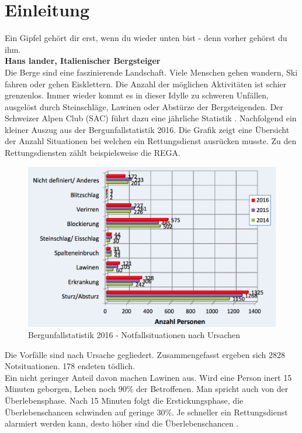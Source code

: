 \documentclass[11pt,english,german]{report}
\theoremstyle{definition}
\begin{document}
\chapter{Einleitung}
Ein Gipfel gehört dir erst, wenn du wieder unten bist - denn vorher gehörst du ihm.\\[0.3cm]
\textbf{Hans lander, Italienischer Bergsteiger\cite{kammerlander}} \\[0.5cm]
\noindent
Die Berge sind eine faszinierende Landschaft. Viele Menschen gehen wandern, Ski fahren oder gehen Eisklettern. Die Anzahl der möglichen Aktivitäten ist schier grenzenlos. Immer wieder kommt es in dieser Idylle zu schweren Unfällen, ausgelöst durch Steinschläge, Lawinen oder Abstürze der Bergsteigenden. Der Schweizer Alpen Club (SAC) führt dazu eine jährliche Statistik \cite{sacaccident}. Nachfolgend ein kleiner Auszug aus der Bergunfallstatistik 2016. Die Grafik zeigt eine Übersicht der Anzahl Situationen bei welchen ein Rettungsdienst ausrücken musste. Zu den Rettungsdiensten zählt beispielsweise die REGA.\\
\begin{figure}[H]
	\centering
	\includegraphics[width=\textwidth]{img/alps/sac_accidentstatistic_2016_reason.png}
	\caption[Bergunfallstatistik 2016 - Notfallsituationen nach Unrsachen]
	{Bergunfallstatistik 2016 - Notfallsituationen nach Ursachen}
\end{figure}
\noindent
Die Vorfälle sind nach Ursache gegliedert. Zusammengefasst ergeben sich 2828 Notsituationen. 178 endeten tödlich.\\[0.3cm]
Ein nicht geringer Anteil davon machen Lawinen aus. Wird eine Person inert 15 Minuten geborgen, Leben noch 90\% der Betroffenen. Man spricht auch von der Überlebensphase. Nach 15 Minuten folgt die Erstickungsphase, die Überlebenschancen schwinden auf geringe 30\%. Je schneller ein Rettungsdienst alarmiert werden kann, desto höher sind die Überlebenschancen \cite{avalancheaccident}. 
\end{document}
